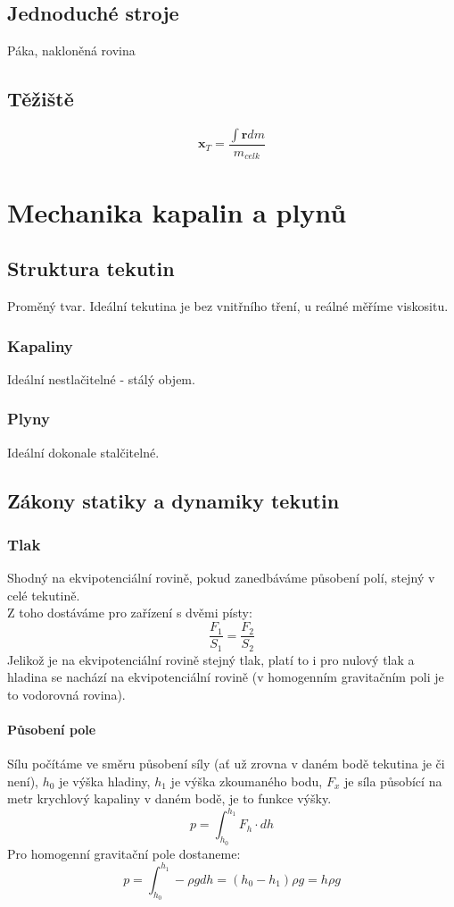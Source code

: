 \documentclass[titlepage]{book}
\begin{document}
\section{Jednoduché stroje}
Páka, nakloněná rovina
\section{Těžiště}
\begin{equation}
\boldsymbol x_T = \frac{\int \boldsymbol r dm}{m_{celk}}
\end{equation}
\chapter{Mechanika kapalin a plynů}
\section{Struktura tekutin}
Proměný tvar. Ideální tekutina je bez vnitřního tření, u reálné měříme viskositu.
\subsection{Kapaliny}
Ideální nestlačitelné - stálý objem.
\subsection{Plyny}
Ideální dokonale stalčitelné.
\section{Zákony statiky a dynamiky tekutin}
\subsection{Tlak}
Shodný na ekvipotenciální rovině, pokud zanedbáváme působení polí, stejný v celé tekutině.\\
Z toho dostáváme pro zařízení s dvěmi písty:\\
\begin{equation}
\frac{F_1}{S_1} = \frac{F_2}{S_2}
\end{equation}
Jelikož je na ekvipotenciální rovině stejný tlak, platí to i pro nulový tlak a hladina se nachází na ekvipotenciální rovině (v homogenním gravitačním poli je to vodorovná rovina).
\subsubsection{Působení pole}
Sílu počítáme ve směru působení síly (ať už zrovna v daném bodě tekutina je či není), $h_0$ je výška hladiny, $h_1$ je výška zkoumaného bodu, $F_x$ je síla působící na metr krychlový kapaliny v daném bodě, je to funkce výšky.\\
\begin{equation}
p = \int_{h_0}^{h_1}F_h \cdot dh
\end{equation}
Pro homogenní gravitační pole dostaneme:\\
\begin{equation}
p = \int_{h_0}^{h_1} - \rho g dh = (h_0 - h_1) \rho g = h \rho g
\end{equation}
\end{document}

